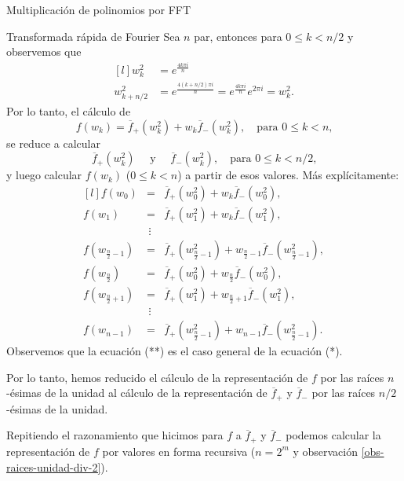 \begin{chapter}{Multiplicación de polinomios por FFT}
\begin{section}{Transformada rápida de Fourier}
    Sea $n$ par, entonces para $0 \le k <n/2$ y observemos que 
    \begin{equation*}
        \begin{matrix*}[l]
            w_k^2 &= e^{\frac{4k\pi i}{n}}   \\
            w_{k+ n/2}^2 &= e^{\frac{4(k+n/2)\pi i}{n}}= e^{\frac{4k\pi i}{n}}e^{2\pi i}= w_k^2.
        \end{matrix*} 
    \end{equation*}
    Por lo tanto,  el cálculo de 
    $$
    f(w_k) = \overline{f}_+(w_k^2) + w_k \overline{f}_-(w_k^2), \quad \text{para $0 \le k < n$,}
    $$
    se reduce a calcular
    $$
    \overline{f}_+(w_k^2) \quad\text{ y }\quad  \overline{f}_-(w_k^2), \quad \text{para $0 \le k < n/2$,}
    $$
    y luego  calcular $f(w_k)$ ($0 \le k <n$) a partir de esos valores. Más explícitamente:
    \begin{equation}
        \begin{matrix*}[l]
            f(w_0) &=& \overline{f}_+(w_0^2) + w_k \overline{f}_-(w_0^2), \\[0.2cm]
            f(w_1) &=& \overline{f}_+(w_1^2) + w_k \overline{f}_-(w_1^2), \\
            &\,\vdots&\\
            f(w_{\frac{n}{2}-1}) &=& \overline{f}_+(w_{\frac{n}{2}-1}^2) + w_{\frac{n}{2}-1} \overline{f}_-(w_{\frac{n}{2}-1}^2), \\[0.3cm]
            f(w_{\frac{n}{2}}) &=& \overline{f}_+(w_{0}^2) + w_{\frac{n}{2}} \overline{f}_-(w_{0}^2), \\[0.2cm]
            f(w_{\frac{n}{2}+1}) &=& \overline{f}_+(w_{1}^2) + w_{\frac{n}{2}+1} \overline{f}_-(w_{1}^2), \\[0.2cm]
            &\,\vdots&\\
            f(w_{n-1}) &=& \overline{f}_+(w_{\frac{n}{2}-1}^2) + w_{n-1} \overline{f}_-(w_{\frac{n}{2}-1}^2).
        \end{matrix*} \tag{**}
    \end{equation}
    Observemos que la ecuación (**) es el caso general de la ecuación (*).

    Por lo tanto, hemos reducido el cálculo de la representación de $f$ por las raíces $n$-ésimas de la unidad al cálculo de la representación de $\overline{f}_+$ y $\overline{f}_-$ por las raíces $n/2$-ésimas de la unidad.
    
    Repitiendo el razonamiento  que hicimos para $f$  a  $\overline{f}_+$ y $\overline{f}_-$ podemos calcular la representación de $f$ por valores en forma recursiva ($n = 2^m$ y observación \ref{obs-raices-unidad-div-2}).
    

\end{section}
\end{chapter}
